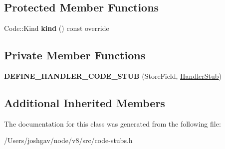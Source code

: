 \subsection*{Protected Member Functions}
\begin{DoxyCompactItemize}
\item 
Code\+::\+Kind {\bfseries kind} () const  override\hypertarget{classv8_1_1internal_1_1_store_field_stub_a793042910e9d0bdac238c71e80a449fa}{}\label{classv8_1_1internal_1_1_store_field_stub_a793042910e9d0bdac238c71e80a449fa}

\end{DoxyCompactItemize}
\subsection*{Private Member Functions}
\begin{DoxyCompactItemize}
\item 
{\bfseries D\+E\+F\+I\+N\+E\+\_\+\+H\+A\+N\+D\+L\+E\+R\+\_\+\+C\+O\+D\+E\+\_\+\+S\+T\+UB} (Store\+Field, \hyperlink{classv8_1_1internal_1_1_handler_stub}{Handler\+Stub})\hypertarget{classv8_1_1internal_1_1_store_field_stub_aab3d76dd6eed2fdb62f6498423f68c7b}{}\label{classv8_1_1internal_1_1_store_field_stub_aab3d76dd6eed2fdb62f6498423f68c7b}

\end{DoxyCompactItemize}
\subsection*{Additional Inherited Members}


The documentation for this class was generated from the following file\+:\begin{DoxyCompactItemize}
\item 
/\+Users/joshgav/node/v8/src/code-\/stubs.\+h\end{DoxyCompactItemize}

